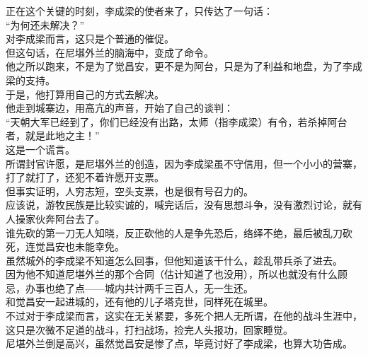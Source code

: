 \begin{multicols}{\theparacolNo}
正在这个关键的时刻，李成梁的使者来了，只传达了一句话：\\

“为何还未解决？”\\

对李成梁而言，这只是个普通的催促。\\

但这句话，在尼堪外兰的脑海中，变成了命令。\\

他之所以跑来，不是为了觉昌安，更不是为阿台，只是为了利益和地盘，为了李成梁的支持。\\

于是，他打算用自己的方式去解决。\\

他走到城寨边，用高亢的声音，开始了自己的谈判：\\

“天朝大军已经到了，你们已经没有出路，太师（指李成梁）有令，若杀掉阿台者，就是此地之主！”\\

这是一个谎言。\\

所谓封官许愿，是尼堪外兰的创造，因为李成梁虽不守信用，但一个小小的营寨，打了就打了，还犯不着许愿开支票。\\

但事实证明，人穷志短，空头支票，也是很有号召力的。\\

应该说，游牧民族是比较实诚的，喊完话后，没有思想斗争，没有激烈讨论，就有人操家伙奔阿台去了。\\

谁先砍的第一刀无人知晓，反正砍他的人是争先恐后，络绎不绝，最后被乱刀砍死，连觉昌安也未能幸免。\\

虽然城外的李成梁不知道怎么回事，但他知道该干什么，趁乱带兵杀了进去。\\

因为他不知道尼堪外兰的那个合同（估计知道了也没用），所以也就没有什么顾忌，办事也绝了点——城内共计两千三百人，无一生还。\\

和觉昌安一起进城的，还有他的儿子塔克世，同样死在城里。\\

不过对于李成梁而言，这实在无关紧要，多死个把人无所谓，在他的战斗生涯中，这只是次微不足道的战斗，打扫战场，捡完人头报功，回家睡觉。\\

尼堪外兰倒是高兴，虽然觉昌安是惨了点，毕竟讨好了李成梁，也算大功告成。\\


\end{multicols}
